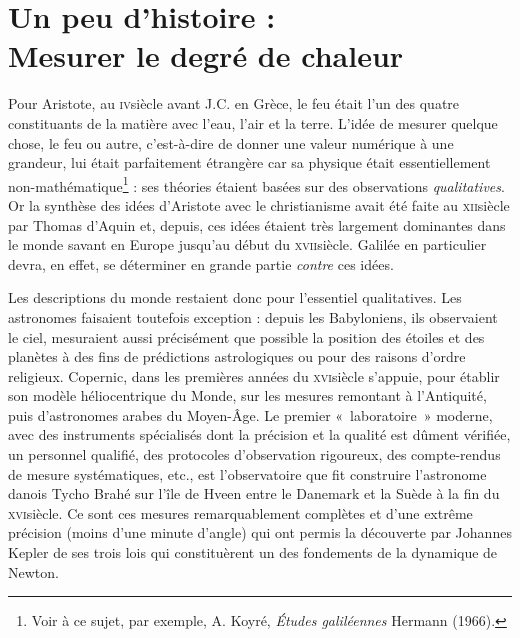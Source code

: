 \atstartofhistorysection
\section[Un peu d’histoire : Mesurer le degré de chaleur]{Un peu d’histoire :\\ Mesurer le degré de chaleur}
\label{ch_histoire_degre_chaleur_depondt}


	Pour Aristote, au \textsc{iv}\ieme siècle avant J.C. en Grèce, le feu était l'un des quatre constituants de la matière avec l'eau, l'air et la terre. L'idée de mesurer quelque chose, le feu ou autre, c'est-à-dire de donner une valeur numérique à une grandeur, lui était parfaitement étrangère car sa physique était essentiellement non-mathématique\footnote{Voir à ce sujet, par exemple, A. Koyré, \textit{Études galiléennes} Hermann (1966).} : ses théories étaient basées sur des observations \emph{qualitatives}. Or la synthèse des idées d'Aristote avec le christianisme avait été faite au \textsc{xii}\ieme siècle par Thomas d'Aquin et, depuis, ces idées étaient très largement dominantes dans le monde savant en Europe jusqu'au début du \textsc{xvii}\ieme siècle. Galilée en particulier devra, en effet, se déterminer en grande partie \emph{contre} ces idées.
	
	Les descriptions du monde restaient donc pour l'essentiel qualitatives. Les astronomes faisaient toutefois exception : depuis les Babyloniens, ils observaient le ciel, mesuraient aussi précisément que possible la position des étoiles et des planètes à des fins de prédictions astrologiques ou pour des raisons d'ordre religieux. Copernic, dans les premières années du \textsc{xvi}\ieme siècle s'appuie, pour établir son modèle héliocentrique du Monde, sur les mesures remontant à l'Antiquité, puis d'astronomes arabes du Moyen-Âge. Le premier «~laboratoire~» moderne, avec des instruments spécialisés dont la précision et la qualité est dûment vérifiée, un personnel qualifié, des protocoles d'observation rigoureux, des compte-rendus de mesure systématiques, etc., est l'observatoire que fit construire l'astronome danois Tycho Brahé sur l'île de Hveen entre le Danemark et la Suède à la fin du \textsc{xvi}\ieme siècle. Ce sont ces mesures remarquablement complètes et d'une extrême précision (moins d'une minute d'angle) qui ont permis la découverte par Johannes Kepler de ses trois lois qui constituèrent un des fondements de la dynamique de Newton.
	

